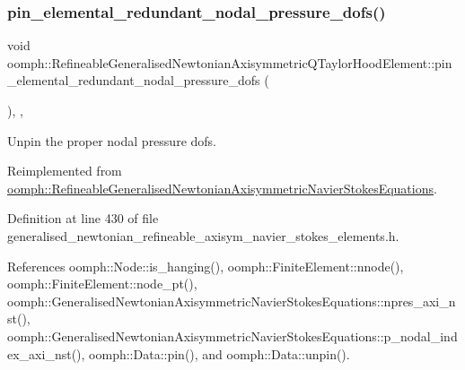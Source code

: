 \subsubsection{\texorpdfstring{pin\+\_\+elemental\+\_\+redundant\+\_\+nodal\+\_\+pressure\+\_\+dofs()}{pin\_elemental\_redundant\_nodal\_pressure\_dofs()}}
{\footnotesize\ttfamily void oomph\+::\+Refineable\+Generalised\+Newtonian\+Axisymmetric\+Q\+Taylor\+Hood\+Element\+::pin\+\_\+elemental\+\_\+redundant\+\_\+nodal\+\_\+pressure\+\_\+dofs (\begin{DoxyParamCaption}{ }\end{DoxyParamCaption})\hspace{0.3cm}{\ttfamily [inline]}, {\ttfamily [private]}, {\ttfamily [virtual]}}



Unpin the proper nodal pressure dofs. 



Reimplemented from \hyperlink{classoomph_1_1RefineableGeneralisedNewtonianAxisymmetricNavierStokesEquations_a1402cf618786a821b31ea44a636acde9}{oomph\+::\+Refineable\+Generalised\+Newtonian\+Axisymmetric\+Navier\+Stokes\+Equations}.



Definition at line 430 of file generalised\+\_\+newtonian\+\_\+refineable\+\_\+axisym\+\_\+navier\+\_\+stokes\+\_\+elements.\+h.



References oomph\+::\+Node\+::is\+\_\+hanging(), oomph\+::\+Finite\+Element\+::nnode(), oomph\+::\+Finite\+Element\+::node\+\_\+pt(), oomph\+::\+Generalised\+Newtonian\+Axisymmetric\+Navier\+Stokes\+Equations\+::npres\+\_\+axi\+\_\+nst(), oomph\+::\+Generalised\+Newtonian\+Axisymmetric\+Navier\+Stokes\+Equations\+::p\+\_\+nodal\+\_\+index\+\_\+axi\+\_\+nst(), oomph\+::\+Data\+::pin(), and oomph\+::\+Data\+::unpin().

\mbox{\label{classoomph_1_1RefineableGeneralisedNewtonianAxisymmetricQTaylorHoodElement_a323d05f3e4ba28e9e9b503f44cb33eb7}} 

